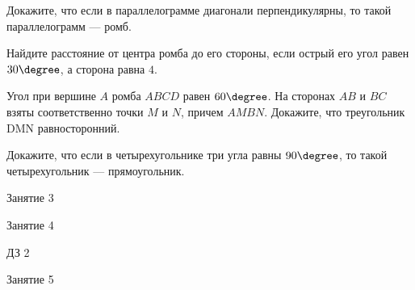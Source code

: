 \begin{homework}[number=1]
	\begin{listofex}
		\item Докажите, что если в параллелограмме диагонали перпендикулярны, то такой параллелограмм --- ромб.
		\item Найдите расстояние от центра ромба до его стороны, если острый его угол равен \( 30\degree \), а сторона равна \( 4 \).
		\item Угол при вершине \( A \) ромба \( ABCD \) равен \( 60\degree \). На сторонах \( AB \) и \( BC \) взяты соответственно точки \( M \) и \( N \), причем \( AMBN \). Докажите, что треугольник DMN равносторонний.
		\item Докажите, что если в четырехугольнике три угла равны \( 90\degree \), то такой четырехугольник --- прямоугольник.
		\item {}
	\end{listofex}
\end{homework}

\begin{class}[number=3]
	\begin{listofex}
		\item Занятие 3
	\end{listofex}
\end{class}

\begin{class}[number=4]
	\begin{listofex}
		\item Занятие 4
	\end{listofex}
\end{class}

\begin{homework}[number=1]
	\begin{listofex}
		\item ДЗ 2
	\end{listofex}
\end{homework}

\begin{class}[number=5]
	\begin{listofex}
		\item Занятие 5
	\end{listofex}
\end{class}

